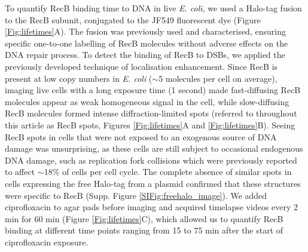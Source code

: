To quantify RecB binding time to DNA in live \textit{E. coli}, we used a Halo-tag fusion to the RecB subunit, conjugated to the JF549 fluorescent dye (Figure \ref{Fig:lifetimes}A). The fusion was previously used and characterised, ensuring specific one-to-one labelling of RecB molecules without adverse effects on the DNA repair process.\cite{Lepore2019a} To detect the binding of RecB to DSBs, we applied the previously developed technique of localisation enhancement.\cite{Yu2006, Elf2007} Since RecB is present at low copy numbers in \textit{E. coli} ($\sim$5 molecules per cell on average\cite{Lepore2019a}), imaging live cells with a long exposure time (1 second) made fast-diffusing RecB molecules appear as weak homogeneous signal in the cell, while slow-diffusing RecB molecules formed intense diffraction-limited spots (referred to throughout this article as RecB spots, Figures \ref{Fig:lifetimes}A and \ref{Fig:lifetimes}B). Seeing RecB spots in cells that were not exposed to an exogenous source of DNA damage was unsurprising, as these cells are still subject to occasional endogenous DNA damage, such as replication fork collisions which were previously reported to affect $\sim$18\% of cells per cell cycle.\cite{Sinha2018} The complete absence of similar spots in cells expressing the free Halo-tag from a plasmid confirmed that these structures were specific to RecB (Supp. Figure \ref{SIFig:freehalo_image}). We added ciprofloxacin to agar pads before imaging and acquired timelapse videos every 2 min for 60 min (Figure \ref{Fig:lifetimes}C), which allowed us to quantify RecB binding at different time points ranging from 15 to 75 min after the start of ciprofloxacin exposure.

